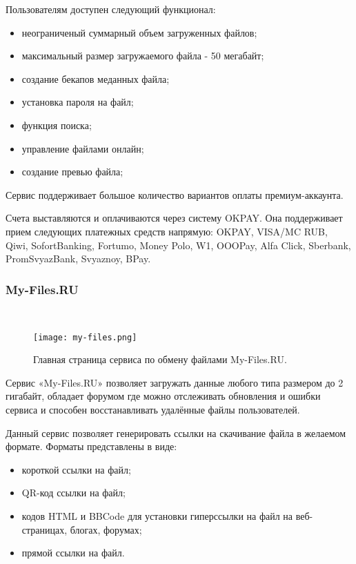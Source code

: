 Пользователям доступен следующий функционал:
\begin{itemize}
  \item неограниченый суммарный объем загруженных файлов;
  \item максимальный размер загружаемого файла - 50 мегабайт;
  \item создание бекапов меданных файла;
  \item установка пароля на файл;
  \item функция поиска;
  \item управление файлами онлайн;
  \item создание превью файла;
\end{itemize}

Сервис поддерживает большое количество вариантов оплаты премиум-аккаунта. 

Счета выставляются и оплачиваются через систему OKPAY. Она поддерживает прием следующих платежных средств напрямую: OKPAY, VISA/MC RUB, Qiwi, SofortBanking, Fortumo, Money Polo, W1, OOOPay, Alfa Click, Sberbank, PromSvyazBank, Svyaznoy, BPay.


\subsubsection{My-Files.RU}~\\
\label{ssub:practice:itechart_characteristic:myfiles}

\begin{figure}[ht]
  \centering
  \texttt{[image: my-files.png]}  
    \caption{ Главная страница сервиса по обмену файлами My-Files.RU. }
    \label{fig:rghost}
\end{figure}

Сервис «My-Files.RU» позволяет загружать данные любого типа размером до 2 гигабайт, обладает форумом где можно отслеживать обновления и ошибки сервиса и способен восстанавливать удалённые файлы пользователей. 

Данный сервис позволяет генерировать ссылки на скачивание файла в желаемом формате.
Форматы представлены в виде:
\begin{itemize}
  \item короткой ссылки на файл;
  \item QR-код ссылки на файл;
  \item кодов HTML и BBCode для установки гиперссылки на файл на веб-страницах, блогах, форумах;
  \item прямой ссылки на файл.
\end{itemize} 


